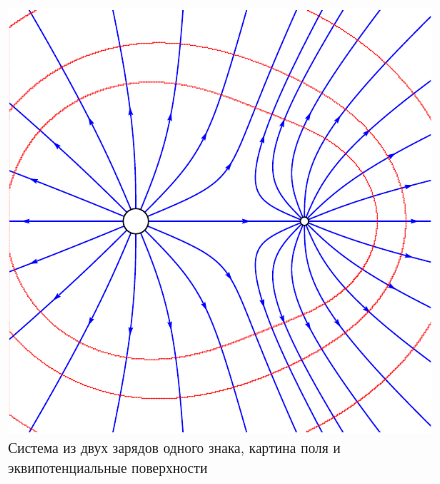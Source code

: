 		\begin{figure}[h!]
			\centering
			\includegraphics[scale=0.75]{./img/fig19/fig19.pdf}
			\caption{Система из двух зарядов одного знака, картина поля и эквипотенциальные поверхности}
		\end{figure}
